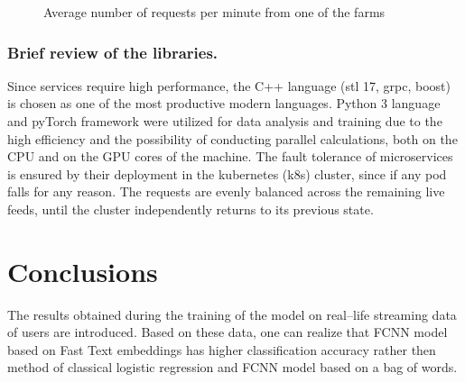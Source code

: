 \documentclass[12pt]{jpconf}
\begin{document}
\begin{figure}
\centering


\caption{\label{fig:03} Average number of requests per minute from one of the farms}

\end{figure}

\subsubsection*{Brief review of the libraries.}
Since services require high performance, the C++ language (stl 17, grpc, boost) is chosen as one of the most productive modern languages. Python 3 language and pyTorch framework were utilized for data analysis and training due to the high efficiency and the possibility of conducting parallel calculations, both on the CPU and on the GPU cores of the machine.
The fault tolerance of microservices is ensured by their deployment in the kubernetes (k8s) cluster, since if any pod falls for any reason. The requests are evenly balanced across the remaining live feeds, until the cluster independently returns to its previous state. 

\section{Conclusions}

The results obtained during the training of the model on real--life streaming data of users are introduced. Based on these data, one can realize that FCNN model based on Fast Text embeddings has higher classification accuracy rather then method of classical logistic regression and FCNN  model based on a bag of words.
\end{document}
